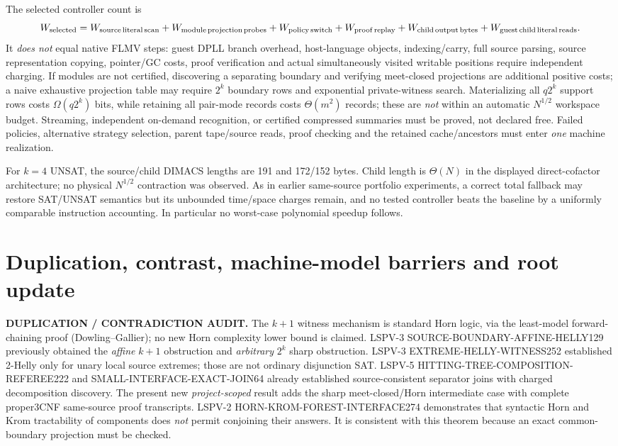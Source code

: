 \documentclass[11pt]{article}
\begin{document}
The selected controller count is
\[
 W_{\rm selected} =
 W_{\rm source\,literal\,scan}
 +W_{\rm module\,projection\,probes}
 +W_{\rm policy\,switch}
 +W_{\rm proof\,replay}
 +W_{\rm child\,output\,bytes}
 +W_{\rm guest\,child\,literal\,reads}.
\]
It \emph{does not} equal native FLMV steps: guest DPLL branch overhead,
host-language objects, indexing/carry, full source parsing, source
representation copying, pointer/GC costs, proof verification and actual
simultaneously visited writable positions require independent charging.
If modules are not certified, discovering a separating boundary and
verifying meet-closed projections are additional positive costs; a
naive exhaustive projection table may require $2^k$ boundary rows
and exponential private-witness search. Materializing all $q2^k$
support rows costs $\Omega(q2^k)$ bits, while retaining all pair-mode
records costs $\Theta(m^2)$ records; these are \emph{not} within an
automatic $N^{1/2}$ workspace budget. Streaming, independent on-demand
recognition, or certified compressed summaries must be proved, not
declared free. Failed policies, alternative strategy selection, parent
tape/source reads, proof checking and the retained cache/ancestors
must enter \emph{one} machine realization.

For $k=4$ UNSAT, the source/child DIMACS lengths are 191 and 172/152
bytes. Child length is $\Theta(N)$ in the displayed direct-cofactor
architecture; no physical $N^{1/2}$ contraction was observed.
As in earlier same-source portfolio experiments, a correct total
fallback may restore SAT/UNSAT semantics but its unbounded time/space
charges remain, and no tested controller beats the baseline by a
uniformly comparable instruction accounting. In particular no
worst-case polynomial speedup follows.

\section{Duplication, contrast, machine-model barriers and root update}
\noindent\textbf{DUPLICATION / CONTRADICTION AUDIT.}
The $k+1$ witness mechanism is standard Horn logic, via the least-model
forward-chaining proof (Dowling--Gallier); no new Horn complexity
lower bound is claimed. LSPV-3 SOURCE-BOUNDARY-AFFINE-HELLY129
previously obtained the \emph{affine} $k+1$ obstruction and
\emph{arbitrary} $2^k$ sharp obstruction. LSPV-3 EXTREME-HELLY-WITNESS252
established 2-Helly only for unary local source extremes; those are
not ordinary disjunction SAT. LSPV-5 HITTING-TREE-COMPOSITION-REFEREE222
and SMALL-INTERFACE-EXACT-JOIN64 already established source-consistent
separator joins with charged decomposition discovery. The present
new \emph{project-scoped} result adds the sharp meet-closed/Horn
intermediate case with complete proper3CNF same-source proof transcripts.
LSPV-2 HORN-KROM-FOREST-INTERFACE274 demonstrates that syntactic
Horn and Krom tractability of components does \emph{not} permit
conjoining their answers. It is consistent with this theorem because
an exact common-boundary projection must be checked.
\end{document}
